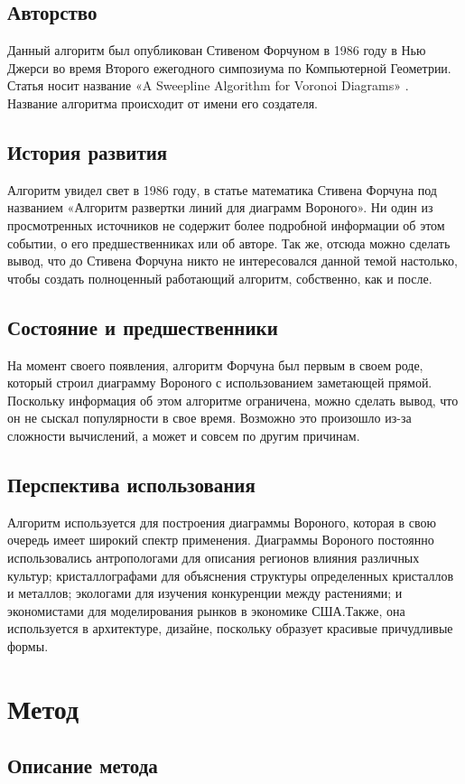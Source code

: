 \documentclass[ a4paper]{article}
\begin{document}
\subsection{Авторство}
Данный алгоритм был опубликован Стивеном Форчуном в 1986 году в Нью Джерси во время Второго ежегодного симпозиума по Компьютерной Геометрии. Статья носит название «A Sweepline Algorithm for Voronoi Diagrams» . Название алгоритма происходит от имени его создателя.
\subsection{История развития}
Алгоритм увидел свет в 1986 году, в статье математика Стивена Форчуна под названием «Алгоритм развертки линий для диаграмм Вороного». Ни один из просмотренных источников не содержит более подробной информации об этом событии, о его предшественниках или об авторе. Так же, отсюда можно сделать вывод, что до Стивена Форчуна никто не интересовался данной темой настолько, чтобы создать полноценный работающий алгоритм, собственно, как и после.
\subsection{Состояние и предшественники}
На момент своего появления, алгоритм Форчуна был первым в своем роде, который строил диаграмму Вороного с использованием заметающей прямой. Поскольку информация об этом алгоритме ограничена, можно сделать вывод, что он не сыскал популярности в свое время. Возможно это произошло из-за сложности вычислений, а может и совсем по другим причинам.
\subsection{Перспектива использования}
Алгоритм используется для построения диаграммы Вороного, которая в свою очередь имеет широкий спектр применения. 
Диаграммы Вороного постоянно использовались антропологами для описания регионов влияния различных культур; кристаллографами для объяснения структуры определенных кристаллов и металлов; экологами для изучения конкуренции между растениями; и экономистами для моделирования рынков в экономике США.Также, она используется в архитектуре, дизайне, поскольку образует красивые причудливые формы. 
\newpage
\section{Метод}
\subsection{Описание метода}
\end{document}

